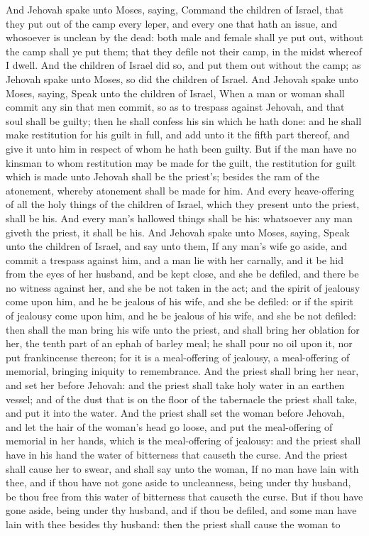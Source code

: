 And Jehovah spake unto Moses, saying, Command the children of Israel, that they put out of the camp every leper, and every one that hath an issue, and whosoever is unclean by the dead: both male and female shall ye put out, without the camp shall ye put them; that they defile not their camp, in the midst whereof I dwell. And the children of Israel did so, and put them out without the camp; as Jehovah spake unto Moses, so did the children of Israel.  And Jehovah spake unto Moses, saying, Speak unto the children of Israel, When a man or woman shall commit any sin that men commit, so as to trespass against Jehovah, and that soul shall be guilty; then he shall confess his sin which he hath done: and he shall make restitution for his guilt in full, and add unto it the fifth part thereof, and give it unto him in respect of whom he hath been guilty. But if the man have no kinsman to whom restitution may be made for the guilt, the restitution for guilt which is made unto Jehovah shall be the priest’s; besides the ram of the atonement, whereby atonement shall be made for him. And every heave-offering of all the holy things of the children of Israel, which they present unto the priest, shall be his. And every man’s hallowed things shall be his: whatsoever any man giveth the priest, it shall be his.  And Jehovah spake unto Moses, saying, Speak unto the children of Israel, and say unto them, If any man’s wife go aside, and commit a trespass against him, and a man lie with her carnally, and it be hid from the eyes of her husband, and be kept close, and she be defiled, and there be no witness against her, and she be not taken in the act; and the spirit of jealousy come upon him, and he be jealous of his wife, and she be defiled: or if the spirit of jealousy come upon him, and he be jealous of his wife, and she be not defiled: then shall the man bring his wife unto the priest, and shall bring her oblation for her, the tenth part of an ephah of barley meal; he shall pour no oil upon it, nor put frankincense thereon; for it is a meal-offering of jealousy, a meal-offering of memorial, bringing iniquity to remembrance.  And the priest shall bring her near, and set her before Jehovah: and the priest shall take holy water in an earthen vessel; and of the dust that is on the floor of the tabernacle the priest shall take, and put it into the water. And the priest shall set the woman before Jehovah, and let the hair of the woman’s head go loose, and put the meal-offering of memorial in her hands, which is the meal-offering of jealousy: and the priest shall have in his hand the water of bitterness that causeth the curse. And the priest shall cause her to swear, and shall say unto the woman, If no man have lain with thee, and if thou have not gone aside to uncleanness, being under thy husband, be thou free from this water of bitterness that causeth the curse. But if thou have gone aside, being under thy husband, and if thou be defiled, and some man have lain with thee besides thy husband: then the priest shall cause the woman to 